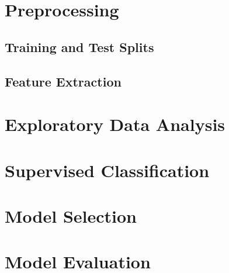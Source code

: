 \documentclass[a4paper]{article}
\begin{document}
	\section{Preprocessing}
	\subsection{Training and Test Splits}
	\subsection{Feature Extraction}
	\section{Exploratory Data Analysis}
	\section{Supervised Classification}
	\section{Model Selection}
	\section{Model Evaluation}
\end{document}
